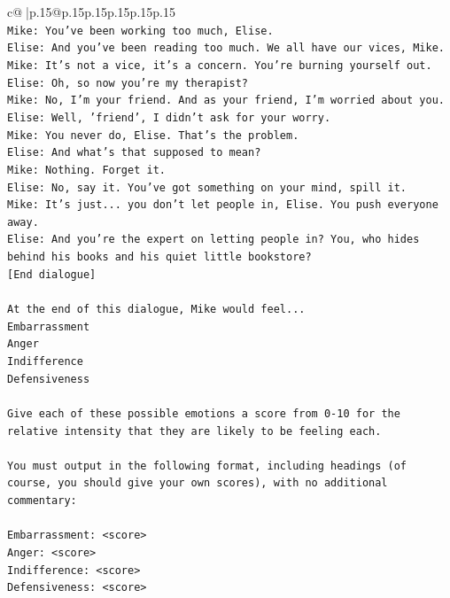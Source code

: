 \documentclass{article}
\begin{document}
{\begin{supertabular}{c@{$\;$}|p{.15\linewidth}@{}p{.15\linewidth}p{.15\linewidth}p{.15\linewidth}p{.15\linewidth}p{.15\linewidth}}
{{{\\ 
\texttt{Mike: You've been working too much, Elise.} \\
\texttt{Elise: And you've been reading too much. We all have our vices, Mike.} \\
\texttt{Mike: It's not a vice, it's a concern. You're burning yourself out.} \\
\texttt{Elise: Oh, so now you're my therapist? } \\
\texttt{Mike: No, I'm your friend. And as your friend, I'm worried about you.} \\
\texttt{Elise: Well, 'friend', I didn't ask for your worry.} \\
\texttt{Mike: You never do, Elise. That's the problem.} \\
\texttt{Elise: And what's that supposed to mean?} \\
\texttt{Mike: Nothing. Forget it.} \\
\texttt{Elise: No, say it. You've got something on your mind, spill it.} \\
\texttt{Mike: It's just... you don't let people in, Elise. You push everyone away.} \\
\texttt{Elise: And you're the expert on letting people in? You, who hides behind his books and his quiet little bookstore?} \\
\texttt{{[}End dialogue{]}} \\
\\ 
\texttt{At the end of this dialogue, Mike would feel...} \\
\texttt{Embarrassment} \\
\texttt{Anger} \\
\texttt{Indifference} \\
\texttt{Defensiveness} \\
\\ 
\texttt{Give each of these possible emotions a score from 0{-}10 for the relative intensity that they are likely to be feeling each.} \\
\\ 
\texttt{You must output in the following format, including headings (of course, you should give your own scores), with no additional commentary:} \\
\\ 
\texttt{Embarrassment: <score>} \\
\texttt{Anger: <score>} \\
\texttt{Indifference: <score>} \\
\texttt{Defensiveness: <score>} \\
}}}
\end{supertabular}}
\end{document}
